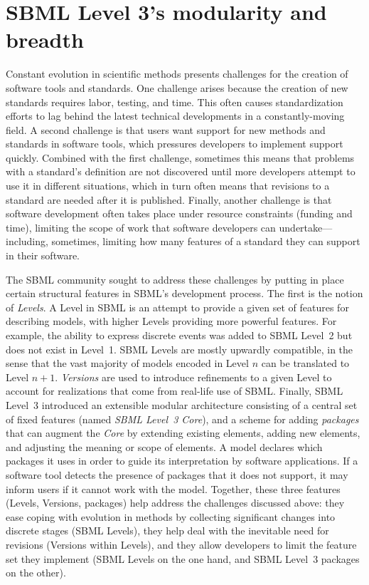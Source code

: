 \documentclass{sbml-paper}
\begin{document}
\clearpage
\newpage

\section*{SBML Level 3's modularity and breadth}\label{sec:modularity}

Constant evolution in scientific methods presents challenges for the creation of software tools and standards.  One challenge arises because the creation of new standards requires labor, testing, and time.  This often causes standardization efforts to lag behind the latest technical developments in a constantly-moving field.  A second challenge is that users want support for new methods and standards in software tools, which pressures developers to implement support quickly.  Combined with the first challenge, sometimes this means that problems with a standard's definition are not discovered until more developers attempt to use it in different situations, which in turn often means that revisions to a standard are needed after it is published.  Finally, another challenge is that software development often takes place under resource constraints (\eg funding and time), limiting the scope of work that software developers can undertake---including, sometimes, limiting how many features of a standard they can support in their software.

The SBML community sought to address these challenges by putting in place certain structural features in SBML's development process.  The first is the notion of \emph{Levels}.  A Level in SBML is an attempt to provide a given set of features for describing models, with higher Levels providing more powerful features.  For example, the ability to express discrete events was added to SBML Level~2 but does not exist in Level~1.  SBML Levels are mostly upwardly compatible, in the sense that the vast majority of models encoded in Level $n$ can be translated to Level $n+1$.  \emph{Versions} are used to introduce refinements to a given Level to account for realizations that come from real-life use of SBML.  Finally, SBML Level~3 introduced an extensible modular architecture consisting of a central set of fixed features (named \emph{SBML Level~3 Core}), and a scheme for adding \emph{packages} that can augment the \emph{Core} by extending existing elements, adding new elements, and adjusting the meaning or scope of elements.  A model declares which packages it uses in order to guide its interpretation by software applications.  If a software tool detects the presence of packages that it does not support, it may inform users if it cannot work with the model.  Together, these three features (Levels, Versions, packages) help address the challenges discussed above: they ease coping with evolution in methods by collecting significant changes into discrete stages (SBML Levels), they help deal with the inevitable need for revisions (Versions within Levels), and they allow developers to limit the feature set they implement (SBML Levels on the one hand, and SBML Level~3 packages on the other).
\end{document}
